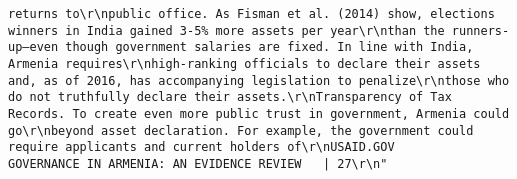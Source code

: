 \documentclass[
]{article}
\begin{document}
\begin{verbatim}
returns to\r\npublic office. As Fisman et al. (2014) show, elections winners in India gained 3-5% more assets per year\r\nthan the runners-up—even though government salaries are fixed. In line with India, Armenia requires\r\nhigh-ranking officials to declare their assets and, as of 2016, has accompanying legislation to penalize\r\nthose who do not truthfully declare their assets.\r\nTransparency of Tax Records. To create even more public trust in government, Armenia could go\r\nbeyond asset declaration. For example, the government could require applicants and current holders of\r\nUSAID.GOV                                                     GOVERNANCE IN ARMENIA: AN EVIDENCE REVIEW   | 27\r\n"                                                                                                                                                                                                                                                                                                                                                                                                                                                                                                                                                                                                                                                                                                                                                                                                                                                                                                                                                                                                                                                     

\end{verbatim}
\end{document}
